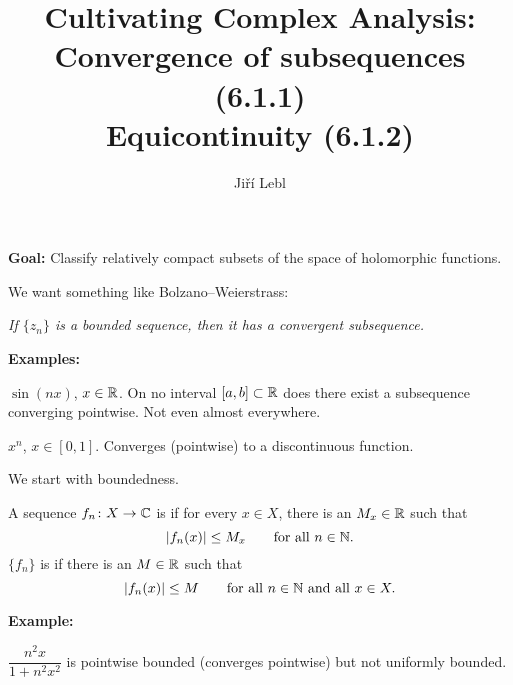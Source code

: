 \documentclass[10pt,aspectratio=169]{beamer}
\author{Ji\v{r}\'i Lebl}
\institute[OSU]{%
Departemento pri Matematiko de Oklahoma {\^S}tata Universitato}
\title{Cultivating Complex Analysis:\\%
Convergence of subsequences (6.1.1)\\%
Equicontinuity (6.1.2)}
\date{}
\begin{document}
\begin{frame}
\titlepage
\end{frame}

\begin{frame}
\textbf{Goal:} Classify relatively compact subsets of the space of holomorphic
functions.

\medskip
\pause

We want something like Bolzano--Weierstrass:

\emph{If $\{ z_n \}$ is a
bounded sequence, then it has a convergent subsequence.}

\bigskip
\pause

\textbf{Examples:}

\medskip

$\sin(nx)$, \enspace $x \in {\mathbb{R}}$. \pause
On no interval $[a,b] \subset {\mathbb{R}}$ does there exist
a subsequence converging pointwise.  Not even almost everywhere.

\medskip
\pause

$x^n$, \enspace $x \in [0,1]$. \pause
Converges (pointwise) to a discontinuous function.

\end{frame}

\begin{frame}
We start with boundedness.

\pause

\begin{definition}
A sequence $f_n \colon X \to {\mathbb{C}}$
is \emph{} if for every $x \in X$, there is an $M_x \in {\mathbb{R}}$
such that
\begin{equation*}
\lvert {f_n(x)} \rvert \leq M_x \qquad \text{for all } n \in {\mathbb{N}} .
\end{equation*}
\pause
$\{ f_n \}$
is \emph{} if there is an $M \in {\mathbb{R}}$
such that
\begin{equation*}
\lvert {f_n(x)} \rvert \leq M \qquad \text{for all } n \in {\mathbb{N}} \text{ and all } x \in X.
\end{equation*}
\end{definition}

\medskip
\pause

\textbf{Example:}

$\dfrac{n^2x}{1+n^2x^2}$ is pointwise bounded (converges pointwise)
but not uniformly bounded.


\end{frame}
\end{document}
